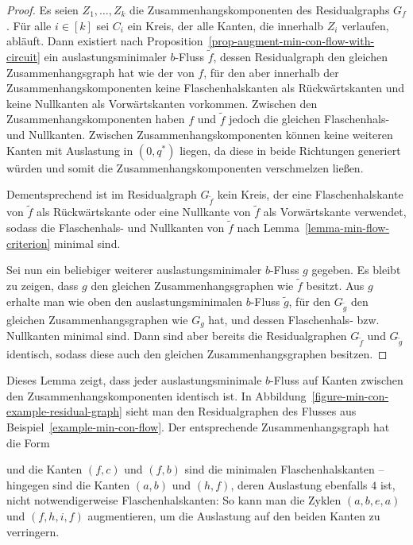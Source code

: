 \begin{proof}
	Es seien $Z_1,\dots, Z_k$ die Zusammenhangskomponenten des Residualgraphs $G_f$.
	Für alle $i\in [k]$ sei $C_i$ ein Kreis, der alle Kanten, die innerhalb $Z_i$ verlaufen, abläuft.
	Dann existiert nach Proposition~\ref{prop-augment-min-con-flow-with-circuit} ein auslastungsminimaler $b$-Fluss $\tilde{f}$, dessen Residualgraph den gleichen Zusammenhangsgraph hat wie der von $f$, für den aber innerhalb der Zusammenhangskomponenten keine Flaschenhalskanten als Rückwärtskanten und keine Nullkanten als Vorwärtskanten vorkommen.
	Zwischen den Zusammenhangskomponenten haben $f$ und $\tilde{f}$ jedoch die gleichen Flaschenhals- und Nullkanten.
	Zwischen Zusammenhangskomponenten können keine weiteren Kanten mit Auslastung in $(0, q^*)$ liegen, da diese in beide Richtungen generiert würden und somit die Zusammenhangskomponenten verschmelzen ließen.
	
	Dementsprechend ist im Residualgraph $G_{\tilde{f}}$ kein Kreis, der eine Flaschenhalskante von $\tilde{f}$ als Rückwärtskante oder eine Nullkante von $\tilde{f}$ als Vorwärtskante verwendet, sodass die Flaschenhals- und Nullkanten von $\tilde{f}$ nach Lemma~\ref{lemma-min-flow-criterion} minimal sind.
	
	Sei nun ein beliebiger weiterer auslastungsminimaler $b$-Fluss $g$ gegeben.
	Es bleibt zu zeigen, dass $g$ den gleichen Zusammenhangsgraphen wie $\tilde{f}$ besitzt.
	Aus $g$ erhalte man wie oben den auslastungsminimalen $b$-Fluss $\tilde{g}$, für den $G_{\tilde{g}}$ den gleichen Zusammenhangsgraphen wie $G_g$ hat, und dessen Flaschenhals- bzw. Nullkanten minimal sind.
	Dann sind aber bereits die Residualgraphen $G_{\tilde{f}}$ und $G_{\tilde{g}}$ identisch, sodass diese auch den gleichen Zusammenhangsgraphen besitzen.
\end{proof}

Dieses Lemma zeigt, dass jeder auslastungsminimale $b$-Fluss auf Kanten zwischen den Zusammenhangskomponenten identisch ist.
In Abbildung~\ref{figure-min-con-example-residual-graph} sieht man den Residualgraphen des Flusses aus Beispiel~\ref{example-min-con-flow}.
Der entsprechende Zusammenhangsgraph hat die Form
\begin{center}
\end{center}
und die Kanten $(f,c)$ und $(f,b)$ sind die minimalen Flaschenhalskanten -- hingegen sind die Kanten $(a,b)$ und $(h,f)$, deren Auslastung ebenfalls $4$ ist, nicht notwendigerweise Flaschenhalskanten: So kann man die Zyklen $(a,b,e,a)$ und $(f,h,i,f)$ augmentieren, um die Auslastung auf den beiden Kanten zu verringern.

